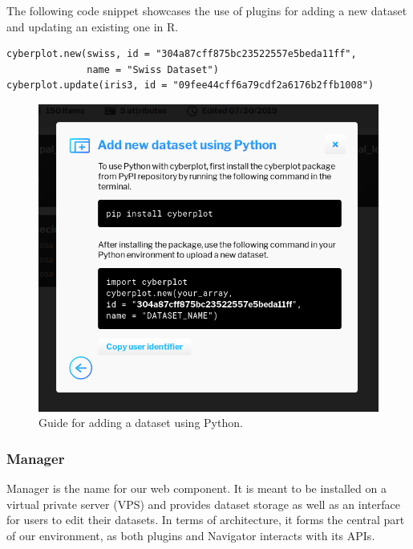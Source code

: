 \documentclass{article}
\begin{document}
The following code snippet showcases the use of plugins for adding a new dataset and updating an existing one in R.

\begin{verbatim}
cyberplot.new(swiss, id = "304a87cff875bc23522557e5beda11ff",
              name = "Swiss Dataset")
cyberplot.update(iris3, id = "09fee44cff6a79cdf2a6176b2ffb1008")
\end{verbatim}

\begin{figure}[!h]
\centering
\includegraphics[scale=0.35]{images/manager_python}
\caption{Guide for adding a dataset using Python.}
\label{fig:managerpython}
\end{figure}

\newpage

\subsubsection{Manager}

Manager is the name for our web component. It is meant to be installed on a virtual private server (VPS) and provides dataset storage as well as an interface for users to edit their datasets. In terms of architecture, it forms the central part of our environment, as both plugins and Navigator interacts with its APIs.\\
\end{document}
